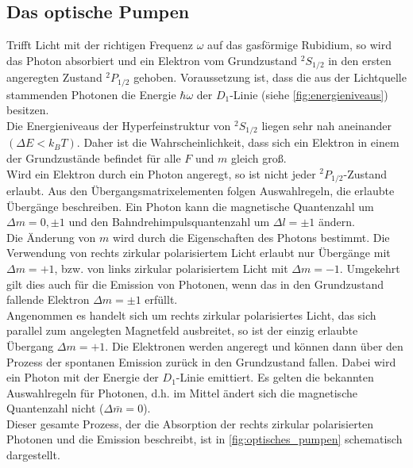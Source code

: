 \subsection{Das optische Pumpen}
\label{sec:optisches_pumpen}
Trifft Licht mit der richtigen Frequenz $\omega$ auf das gasförmige Rubidium, so wird das Photon absorbiert und ein Elektron vom Grundzustand $^2S_{1/2}$ in den ersten angeregten Zustand $^2P_{1/2}$ gehoben.
Voraussetzung ist, dass die aus der Lichtquelle stammenden Photonen die Energie $\hbar \omega$ der $D_1$-Linie (siehe \autoref{fig:energieniveaus}) besitzen.
\\
Die Energieniveaus der Hyperfeinstruktur von $^2S_{1/2}$ liegen sehr nah aneinander $(\Delta E < k_B T)$.
Daher ist die Wahrscheinlichkeit, dass sich ein Elektron in einem der Grundzustände befindet für alle $F$ und $m$ gleich groß.
\\
Wird ein Elektron durch ein Photon angeregt, so ist nicht jeder $^2P_{1/2}$-Zustand erlaubt.
Aus den Übergangsmatrixelementen folgen Auswahlregeln, die erlaubte Übergänge beschreiben.
Ein Photon kann die magnetische Quantenzahl um $\Delta m = 0, \pm 1$ und den Bahndrehimpulsquantenzahl um $\Delta l = \pm 1$ ändern.
\\
Die Änderung von $m$ wird durch die Eigenschaften des Photons bestimmt.
Die Verwendung von rechts zirkular polarisiertem Licht erlaubt nur Übergänge mit $\Delta m = +1$, bzw. von links zirkular polarisiertem Licht mit $\Delta m = -1$.
Umgekehrt gilt dies auch für die Emission von Photonen, wenn das in den Grundzustand fallende Elektron $\Delta m = \pm 1$ erfüllt.
\\
Angenommen es handelt sich um rechts zirkular polarisiertes Licht, das sich parallel zum angelegten Magnetfeld ausbreitet, so ist der einzig erlaubte Übergang $\Delta m = +1$.
Die Elektronen werden angeregt und können dann über den Prozess der spontanen Emission zurück in den Grundzustand fallen.
Dabei wird ein Photon mit der Energie der $D_1$-Linie emittiert.
Es gelten die bekannten Auswahlregeln für Photonen, d.h. im Mittel ändert sich die magnetische Quantenzahl nicht ($\Delta \bar{m} = 0$).
\\
Dieser gesamte Prozess, der die Absorption der rechts zirkular polarisierten Photonen und die Emission beschreibt, ist in \autoref{fig:optisches_pumpen} schematisch dargestellt.
